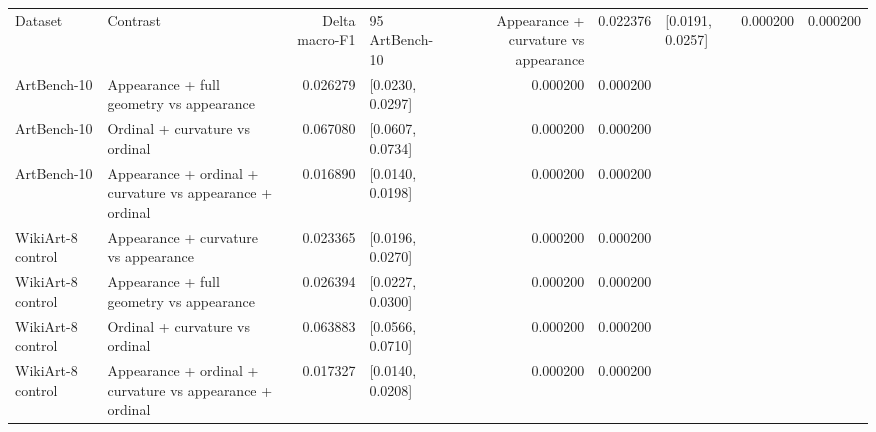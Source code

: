 \begin{tabular}{llrlrr}
\toprule
Dataset & Contrast & Delta macro-F1 & 95%
\midrule
ArtBench-10 & Appearance + curvature vs appearance & 0.022376 & [0.0191, 0.0257] & 0.000200 & 0.000200 \\
ArtBench-10 & Appearance + full geometry vs appearance & 0.026279 & [0.0230, 0.0297] & 0.000200 & 0.000200 \\
ArtBench-10 & Ordinal + curvature vs ordinal & 0.067080 & [0.0607, 0.0734] & 0.000200 & 0.000200 \\
ArtBench-10 & Appearance + ordinal + curvature vs appearance + ordinal & 0.016890 & [0.0140, 0.0198] & 0.000200 & 0.000200 \\
WikiArt-8 control & Appearance + curvature vs appearance & 0.023365 & [0.0196, 0.0270] & 0.000200 & 0.000200 \\
WikiArt-8 control & Appearance + full geometry vs appearance & 0.026394 & [0.0227, 0.0300] & 0.000200 & 0.000200 \\
WikiArt-8 control & Ordinal + curvature vs ordinal & 0.063883 & [0.0566, 0.0710] & 0.000200 & 0.000200 \\
WikiArt-8 control & Appearance + ordinal + curvature vs appearance + ordinal & 0.017327 & [0.0140, 0.0208] & 0.000200 & 0.000200 \\
\bottomrule
\end{tabular}
